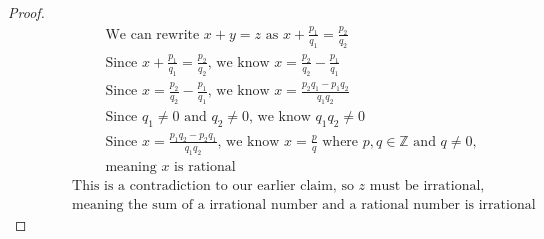 \documentclass{article}
\begin{document}
\begin{itemize}
\begin{itemize}
\begin{proof}
\begin{align}
                &\quad \hspace{2cm} \text{We can rewrite } x + y = z \text{ as } x + \frac{p_1}{q_1} = \frac{p_2}{q_2} \\
                &\quad \hspace{2cm} \text{Since } x + \frac{p_1}{q_1} = \frac{p_2}{q_2} \text{, we know } x = \frac{p_2}{q_2} - \frac{p_1}{q_1} \\
                &\quad \hspace{2cm} \text{Since } x = \frac{p_2}{q_2} - \frac{p_1}{q_1} \text{, we know } x = \frac{p_2q_1 - p_1q_2}{q_1q_2} \\
                &\quad \hspace{2cm} \text{Since } q_1 \neq 0 \text{ and } q_2 \neq 0 \text{, we know } q_1q_2 \neq 0 \\
                &\quad \hspace{2cm} \text{Since } x = \frac{p_1q_2 - p_2q_1}{q_1q_2} \text{, we know } x = \frac{p}{q} \text{ where } p,q \in \mathbb{Z} \text{ and } q \neq 0, \\
                &\quad \hspace{2cm} \text{meaning $x$ is rational } \nonumber \\
                &\quad \hspace{1cm} \text{This is a contradiction to our earlier claim, so } z \text{ must be irrational,} \\
                &\quad \hspace{1cm} \text{meaning the sum of a irrational number and a rational number is irrational} \nonumber
            \end{align}
        \end{proof}
    \end{itemize}
\end{itemize}
\end{document}
